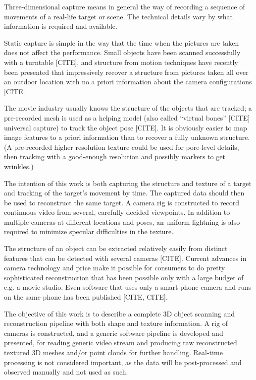 Three-dimensional capture means in general the way of recording a sequence of movements of a real-life target or scene.
The technical details vary by what information is required and available.

Static capture is simple in the way that the time when the pictures are taken does not affect the performance.
Small objects have been scanned successfully with a turntable [CITE], and structure from motion techniques have recently been presented that impressively recover a structure from pictures taken all over an outdoor location with no a priori information about the camera configurations [CITE].

The movie industry usually knows the structure of the objects that are tracked; a pre-recorded mesh is used as a helping model (also called ``virtual bones'' [CITE] universal capture) to track the object pose [CITE].
It is obviously easier to map image features to a priori information than to recover a fully unknown structure.
(A pre-recorded higher resolution texture could be used for pore-level details, then tracking with a good-enough resolution and possibly markers to get wrinkles.)

The intention of this work is both capturing the structure and texture of a target and tracking of the target's movement by time.
The captured data should then be used to reconstruct the same target.
A camera rig is constructed to record continuous video from several, carefully decided viewpoints.
In addition to multiple cameras at different locations and poses, an uniform lightning is also required to minimize specular difficulties in the texture.

The structure of an object can be extracted relatively easily from distinct features that can be detected with several cameras [CITE].
Current advances in camera technology and price make it possible for consumers to do pretty sophisticated reconstruction that has been possible only with a large budget of e.g. a movie studio.
Even software that uses only a smart phone camera and runs on the same phone has been published [CITE, CITE].

The objective of this work is to describe a complete 3D object scanning and reconstruction pipeline with both shape and texture information.
A rig of cameras is constructed, and a generic software pipeline is developed and presented, for reading generic video stream and producing raw reconstructed textured 3D meshes and/or point clouds for further handling.
Real-time processing is not considered important, as the data will be post-processed and observed manually and not used as such.

